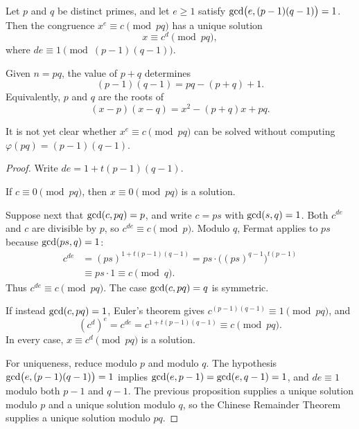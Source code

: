 \begin{keybox}
\begin{proposition}
Let \(p\) and \(q\) be distinct primes, and let \(e\ge 1\) satisfy \(\operatorname{gcd}\bigl(e,(p-1)(q-1)\bigr)=1\). Then the congruence \(x^{e}\equiv c\pmod{pq}\) has a unique solution
\[
    x\equiv c^{d}\pmod{pq},
\]
where \(de\equiv 1\pmod{(p-1)(q-1)}\).
\end{proposition}
\end{keybox}

\begin{remark}[Knowing \(p+q\)]
Given \(n=pq\), the value of \(p+q\) determines
\[
    (p-1)(q-1)=pq-(p+q)+1.
\]
Equivalently, \(p\) and \(q\) are the roots of
\[
    (x-p)(x-q)=x^{2}-(p+q)x+pq.
\]
\end{remark}

\begin{remark}
It is not yet clear whether \(x^{e}\equiv c\pmod{pq}\) can be solved without computing \(\varphi(pq)=(p-1)(q-1)\).
\end{remark}


\begin{proof}
Write \(de=1+t(p-1)(q-1)\).

If \(c\equiv 0\pmod{pq}\), then \(x\equiv 0\pmod{pq}\) is a solution.

Suppose next that \(\operatorname{gcd}(c,pq)=p\), and write \(c=ps\) with \(\operatorname{gcd}(s,q)=1\). Both \(c^{de}\) and \(c\) are divisible by \(p\), so \(c^{de}\equiv c\pmod{p}\). Modulo \(q\), Fermat applies to \(ps\) because \(\operatorname{gcd}(ps,q)=1\):
\begin{align*}
    c^{de}
    &=(ps)^{1+t(p-1)(q-1)}
     =ps\cdot\bigl((ps)^{q-1}\bigr)^{t(p-1)}\\
    &\equiv ps\cdot 1
     \equiv c\pmod{q}.
\end{align*}
Thus \(c^{de}\equiv c\pmod{pq}\). The case \(\operatorname{gcd}(c,pq)=q\) is symmetric.

If instead \(\operatorname{gcd}(c,pq)=1\), Euler's theorem gives \(c^{(p-1)(q-1)}\equiv 1\pmod{pq}\), and
\[
    (c^{d})^{e}
    =c^{de}
    =c^{1+t(p-1)(q-1)}
    \equiv c\pmod{pq}.
\]
In every case, \(x\equiv c^{d}\pmod{pq}\) is a solution.

For uniqueness, reduce modulo \(p\) and modulo \(q\). The hypothesis \(\operatorname{gcd}\bigl(e,(p-1)(q-1)\bigr)=1\) implies \(\operatorname{gcd}(e,p-1)=\operatorname{gcd}(e,q-1)=1\), and \(de\equiv 1\) modulo both \(p-1\) and \(q-1\). The previous proposition supplies a unique solution modulo \(p\) and a unique solution modulo \(q\), so the Chinese Remainder Theorem supplies a unique solution modulo \(pq\).
\end{proof}


